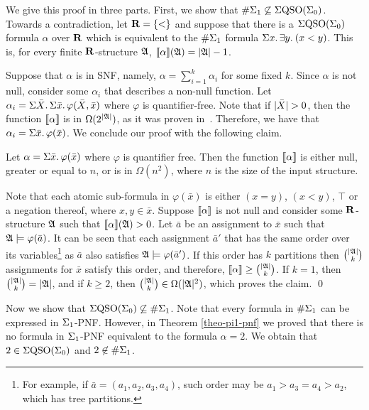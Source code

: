 We give this proof in three parts.
First, we show that $\#\Sigma_{1} \not\subseteq \Sigma{\rm QSO}(\Sigma_{0})$. 
Towards a contradiction, let $\mathbf{R} = \{ < \}$ and suppose that there is a $\Sigma{\rm QSO}(\Sigma_{0})$ formula $\alpha$ over $\mathbf{R}$ which is equivalent to the $\#\Sigma_{1}$ formula $\Sigma{x}.\, \exists{y}.\: (x < y)$. 
This is, for every finite $\mathbf{R}$-structure $\mathfrak{A}$, ${\llbracket{}{\alpha}\rrbracket}(\mathfrak{A}) = \vert \mathfrak{A} \vert - 1$.

Suppose that $\alpha$ is in SNF, namely, $\alpha = \sum_{i = 1}^k \alpha_i$ for some fixed $k$. 
Since $\alpha$ is not null, consider some $\alpha_i$ that describes a non-null function. 
Let $\alpha_i = \Sigma{\bar{X}}.\,\Sigma{\bar{x}}.\,\varphi(\bar{X},\bar{x})$ where $\varphi$ is quantifier-free. 
Note that if $\vert \bar{X} \vert > 0$, then the function ${\llbracket{}{\alpha}\rrbracket}$ is in $\Omega(2^{\vert \mathfrak{A} \vert})$, as it was proven in~\cite{SalujaST95}. 
Therefore, we have that $\alpha_i = \Sigma{\bar{x}}.\,\varphi(\bar{x})$. 
We conclude our proof with the following claim.
\begin{clm}
	Let $\alpha = \Sigma{\bar{x}}.\,\varphi(\bar{x})$	where $\varphi$ is quantifier free. 
	Then the function ${\llbracket{}{\alpha}\rrbracket}$ is either null, greater or equal to $n$, or is in $\Omega(n^2)$, where $n$ is the size of the input structure.
\end{clm}
\proof
	Note that each atomic sub-formula in $\varphi(\bar{x})$ is either $(x = y)$, $(x < y)$, $\top$ or a negation thereof, where $x,y\in\bar{x}$. 
	Suppose ${\llbracket{}{\alpha}\rrbracket}$ is not null and consider some $\mathbf{R}$-structure $\mathfrak{A}$ such that ${\llbracket{}{\alpha}\rrbracket}(\mathfrak{A}) > 0$. 
	Let $\bar{a}$ be an assignment to $\bar{x}$ such that $\mathfrak{A}\models\varphi(\bar{a})$. 
	It can be seen that each assignment $\bar{a}'$ that has the same order over its variables\footnote{For example, if $\bar{a} = (a_1,a_2,a_3,a_4)$, such order may be $a_1 > a_3 = a_4 > a_2$, which has tree partitions.}	as $\bar{a}$ also satisfies $\mathfrak{A}\models\varphi(\bar{a}')$. 
	If this order has $k$ partitions then $\binom{\vert \mathfrak{A} \vert}{k}$ assignments for $\bar{x}$ satisfy this order, and therefore, ${\llbracket{}{\alpha}\rrbracket} \geq \binom{\vert \mathfrak{A} \vert}{k}$. 
	If $k = 1$, then $\binom{\vert \mathfrak{A} \vert}{k} = \vert \mathfrak{A} \vert$, and if $k \geq 2$, then $\binom{\vert \mathfrak{A} \vert}{k} \in \Omega(\vert \mathfrak{A} \vert^2)$, which proves the claim.
\qed

Now we show that $\Sigma{\rm QSO}(\Sigma_{0}) \not\subseteq \#\Sigma_{1}$. Note that every formula in $\#\Sigma_{1}$ can be expressed in $\Sigma_{1}$-PNF. However, in Theorem \ref{theo-pi1-pnf} we proved that there is no formula in $\Sigma_{1}$-PNF equivalent to the formula $\alpha = 2$. We obtain that $2 \in \Sigma{\rm QSO}(\Sigma_{0})$ and $2 \not\in \#\Sigma_{1}$.

